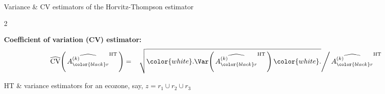 \begin{frame}{\vskip -0.5cm \large Variance \& CV estimators of the Horvitz-Thompson estimator}
\begin{multicols}{2}
\end{multicols}

\textbf{Coefficient of variation (CV) estimator:}
\begin{eqnarray*}
\widehat{\textnormal{CV}}\!\left(\,\widehat{A^{(k)}_{{\color{black}r}}}^{\textnormal{HT}}\,\right)
& = &
	\left.
		\sqrt{{\color{white}.}\Var\!\left(\,\widehat{A^{(k)}_{{\color{black}r}}}^{\textnormal{HT}}\,\right){\color{white}.}}
		\right/
	\widehat{A^{(k)}_{{\color{black}r}}}^{\textnormal{HT}}
\end{eqnarray*}

\end{frame}
\normalsize

\begin{frame}{\vskip -0.5cm \large HT \& variance estimators for an ecozone, say, $z = r_{1} \cup r_{2} \cup r_{3}$}

\scriptsize


\end{frame}
